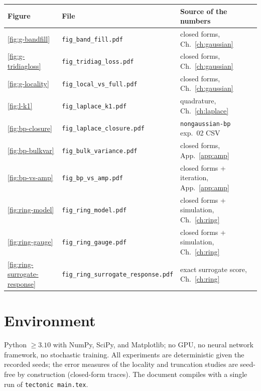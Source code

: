 \begin{center}\small
\begin{tabular}{@{}lll@{}}
\toprule
Figure & File & Source of the numbers \\
\midrule
\ref{fig:g-bandfill} & \texttt{fig\_band\_fill.pdf} & closed forms, Ch.~\ref{ch:gaussian} \\
\ref{fig:g-tridiagloss} & \texttt{fig\_tridiag\_loss.pdf} & closed forms, Ch.~\ref{ch:gaussian} \\
\ref{fig:g-locality} & \texttt{fig\_local\_vs\_full.pdf} & closed forms, Ch.~\ref{ch:gaussian} \\
\ref{fig:l-k1} & \texttt{fig\_laplace\_k1.pdf} & quadrature, Ch.~\ref{ch:laplace} \\
\ref{fig:bp-closure} & \texttt{fig\_laplace\_closure.pdf} & \texttt{nongaussian-bp} exp.~02 CSV \\
\ref{fig:bp-bulkvar} & \texttt{fig\_bulk\_variance.pdf} & closed forms, App.~\ref{app:amp} \\
\ref{fig:bp-vs-amp} & \texttt{fig\_bp\_vs\_amp.pdf} & closed forms + iteration, App.~\ref{app:amp} \\
\ref{fig:ring-model} & \texttt{fig\_ring\_model.pdf} & closed forms + simulation, Ch.~\ref{ch:ring} \\
\ref{fig:ring-gauge} & \texttt{fig\_ring\_gauge.pdf} & closed forms + simulation, Ch.~\ref{ch:ring} \\
\ref{fig:ring-surrogate-response} & \texttt{fig\_ring\_surrogate\_response.pdf} & exact surrogate score, Ch.~\ref{ch:ring} \\
\bottomrule
\end{tabular}
\end{center}

\section{Environment}

Python $\geq 3.10$ with NumPy, SciPy, and Matplotlib; no GPU, no neural
network framework, no stochastic training. All experiments are
deterministic given the recorded seeds; the error measures of the
locality and truncation studies are seed-free by construction
(closed-form traces). The document compiles with a single run of
\texttt{tectonic main.tex}.
